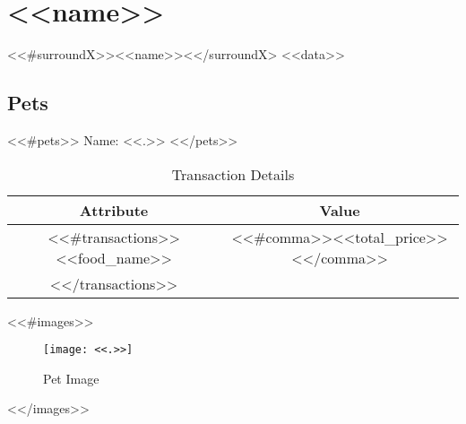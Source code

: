 \section{ <<name>> }
<<#surroundX>><<name>><</surroundX>
<<data>>

\subsection{Pets}
<<#pets>>
Name: <<.>>
<</pets>>

\begin{table}[h!]
\centering
\begin{tabular}{|c|c|}
\hline
Attribute & Value \\ \hline
<<#transactions>>
<<food_name>> & <<#comma>><<total_price>><</comma>> \\
<</transactions>>
\hline
\end{tabular}
\caption{Transaction Details}
\end{table}

<<#images>>
\begin{figure}[h!]
\centering
\texttt{[image: <<.>>]}
\caption{Pet Image}
\end{figure}
<</images>>
